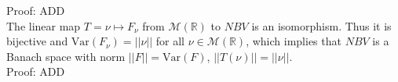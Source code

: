 \documentclass[12pt]{article}
\newcommand{\reals}[0] { \mathbb{R}}
\newcommand{\M}[0] { \mathcal{M} }
\newcommand{ \Var } { \textrm{Var} }
\begin{document}
\noindent
Proof: ADD \\


The linear map $T = \nu \mapsto F_\nu$ from $\M(\reals)$ to $NBV$ is an isomorphism. Thus it is bijective and $\Var(F_\nu) = ||\nu||$ for all $\nu \in \M(\reals)$, which implies that $NBV$ is a Banach space with norm $||F|| = \Var(F)$, $||T(\nu)|| = ||\nu||$. \\



\noindent
Proof: ADD \\
\end{document}
